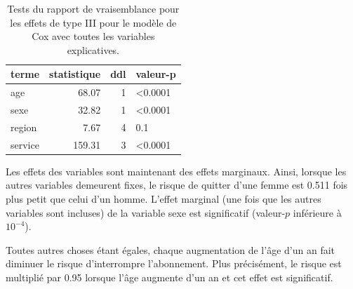 \documentclass[
  11pt,
  letterpaper,
]{scrbook}
\theoremstyle{definition}
\theoremstyle{remark}
\begin{document}
\hypertarget{tbl-survie5-deviance}{}
\begin{table}
\caption{\label{tbl-survie5-deviance}Tests du rapport de vraisemblance pour les effets de type III pour le
modèle de Cox avec toutes les variables explicatives. }\tabularnewline

\centering
\begin{tabular}{lrrl}
\toprule
terme & statistique & ddl & valeur-p\\
\midrule
age & 68.07 & 1 & <0.0001\\
sexe & 32.82 & 1 & <0.0001\\
region & 7.67 & 4 & 0.1\\
service & 159.31 & 3 & <0.0001\\
\bottomrule
\end{tabular}
\end{table}

Les effets des variables sont maintenant des effets marginaux. Ainsi,
lorsque les autres variables demeurent fixes, le risque de quitter d'une
femme est 0.511 fois plus petit que celui d'un homme. L'effet marginal
(une fois que les autres variables sont incluses) de la variable sexe
est significatif (valeur-\(p\) inférieure à \(10^{-4}\)).

Toutes autres choses étant égales, chaque augmentation de l'âge d'un an
fait diminuer le risque d'interrompre l'abonnement. Plus précisément, le
risque est multiplié par 0.95 lorsque l'âge augmente d'un an et cet
effet est significatif.
\end{document}
